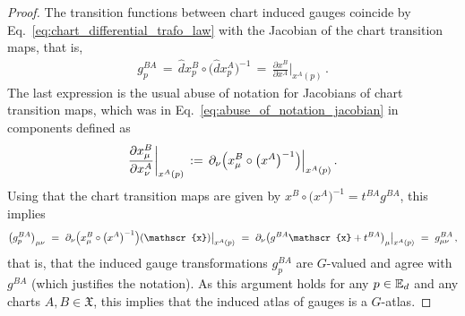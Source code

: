 \begin{proof}
    The transition functions between chart induced gauges coincide by Eq.~\eqref{eq:chart_differential_trafo_law} with the Jacobian of the chart transition maps, that is,
    \begin{align}
        g_p^{BA} \,=\, \hat{d}x^B_p \circ \big(\hat{d}x^A_p \big)^{-1} \,=\, \frac{\partial x^B}{\partial x^A} \Big|_{x^A(p)} \,.
    \end{align}
    The last expression is the usual abuse of notation for Jacobians of chart transition maps, which was in Eq.~\eqref{eq:abuse_of_notation_jacobian} in components defined as
    \begin{align}
        \frac{\partial x^B_\mu}{\partial x^A_\nu} \bigg|_{x^A(p)}
        \,:=\,
        \partial_\nu \pig(x^B_\mu \circ \big(x^A\big)^{-1} \pig) \Big|_{x^A(p)} \,.
    \end{align}
    Using that the chart transition maps are given by $x^B \circ \big(x^A\big)^{-1} = t^{BA} g^{BA}$, this implies
    \begin{align}
        \big( g_p^{BA} \big)_{\mu\nu}
        \ =\ \partial_\nu \pig(x^B_\mu \circ \big(x^A\big)^{-1} \pig) (\mathscr{x}) \big|_{x^A(p)}
        \ =\ \partial_\nu \big( g^{BA} \mathscr{x} + t^{BA} \big)_\mu \big|_{x^A(p)}
        \ =\ g^{BA}_{\mu\nu} \,,
    \end{align}
    that is, that the induced gauge transformations $g_p^{BA}$ are $G$-valued and agree with $g^{BA}$ (which justifies the notation).
    As this argument holds for any $p\in \mathbb{E}_d$ and any charts $A,B \in \mathfrak{X}$, this implies that the induced atlas of gauges is a $G$-atlas.
\end{proof}


